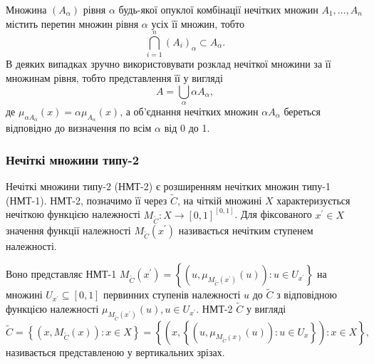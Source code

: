\documentclass[14pt, a4paper, oneside]{extarticle}
\numberwithin{equation}{section}
\begin{document}
Множина $\left(A_\alpha\right)$ рівня $\alpha$ будь-якої опуклої комбінації нечітких множин $A_1, \ldots, A_n$ містить перетин множин рівня $\alpha$ усіх її множин, тобто
\begin{equation*}
\bigcap_{i=1}^n\left(A_i\right)_\alpha \subset A_{\alpha}.
\end{equation*}
В деяких випадках зручно використовувати розклад нечіткої множини за її множинам рівня, тобто представлення її у вигляді
\begin{equation*}
A=\bigcup_\alpha \alpha A_\alpha,
\end{equation*}
де $\mu_{\alpha A_\alpha}(x)=\alpha \mu_{A_\alpha}(x)$, а об'єднання нечітких множин $\alpha A_\alpha$ береться відповідно до визначення по всім $\alpha$ від 0 до 1.

\subsubsection{Нечіткі множини типу-2}
Нечіткі множини типу-2 (НМТ-2) є розширенням нечітких множин типу-1 (НМТ-1). НМТ-2, позначимо її через $\tilde{C}$, на чіткій множині $X$ характеризується нечіткою функцією належності $M_{\tilde{C}}: X \rightarrow[0,1]^{[0,1]}$. Для фіксованого $x^{\prime} \in X$ значення функції належності $M_{\tilde{C}}\left(x^{\prime}\right)$ називається нечітким ступенем належності. 

Воно представляє НМТ-1 $M_{\tilde{C}}\left(x^{\prime}\right)=\left\{\left(u, \mu_{M_{\tilde{C}}\left(x^{\prime}\right)}(u)\right): u \in U_{x^{\prime}}\right\}$ на множині $U_{x^{\prime}} \subseteq[0,1]$ первинних ступенів належності $u$ до $\tilde{C}$ з відповідною функцією належності $\mu_{M_{\tilde{C}}\left(x^{\prime}\right)}(u), u \in U_{x^{\prime}}$. НМТ-2 $\tilde{C}$ у вигляді
\begin{equation*}
\tilde{C}=\left\{\left(x, M_{\tilde{C}}(x)\right): x \in X\right\}=\left\{\left(x,\left\{\left(u, \mu_{M_{\tilde{C}}(x)}(u)\right): u \in U_{x}\right\}\right): x \in X\right\},
\end{equation*}
називається представленою у вертикальних зрізах.
\end{document}
